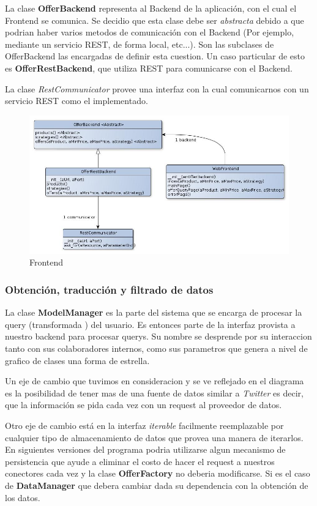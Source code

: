 \documentclass[10pt, a4paper]{article}
\begin{document}
La clase \textbf{OfferBackend} representa al Backend de la aplicación, con el cual el Frontend se comunica. Se decidio que esta clase debe ser \emph{abstracta} debido a que podrian haber varios metodos de comunicación con el Backend (Por ejemplo, mediante un servicio REST, de forma local, etc...). Son las subclases de OfferBackend las encargadas de definir esta cuestion. Un caso particular de esto es \textbf{OfferRestBackend}, que utiliza REST para comunicarse con el Backend. 

La clase \emph{RestCommunicator} provee una interfaz con la cual comunicarnos con un servicio REST como el implementado. 

\begin{figure}[H]
\centering
\includegraphics[scale=0.6]{graphics/frontend_class.jpg}
\caption{Frontend}
\end{figure}
\newpage


\subsubsection{Obtenci\'on, traducci\'on y filtrado de datos}
La clase \textbf{ModelManager} es la parte del sistema que se encarga de procesar la query (transformada ) del usuario. Es entonces parte de la interfaz provista a nuestro backend para procesar querys. Su nombre se desprende por su interaccion tanto con sus colaboradores internos, como sus parametros que genera a nivel de grafico de clases una forma de estrella.

Un eje de cambio que tuvimos en consideracion y se ve reflejado en el diagrama es la posibilidad de tener mas de una fuente de datos similar a \emph{Twitter} es decir, que la informaci\'on se pida cada vez con un request al proveedor de datos.

Otro eje de cambio est\'a en la interfaz \emph{iterable} facilmente reemplazable por cualquier tipo de almacenamiento de datos que provea una manera de iterarlos. En siguientes versiones del programa podria utilizarse algun mecanismo de persistencia que ayude a eliminar el costo de hacer el request a nuestros conectores cada vez y la clase \textbf{OfferFactory} no deberia modificarse. Si es el caso de \textbf{DataManager} que debera cambiar dada su dependencia con la obtenci\'on de los datos.
\end{document}

